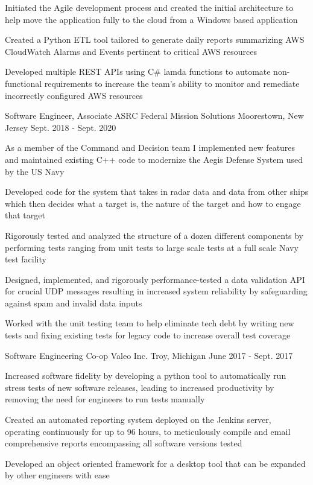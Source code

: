\begin{cventries}
{\begin{cvitems}
        \item {Initiated the Agile development process and created the initial architecture to help move the application fully to the cloud from a Windows based application}
        \item {Created a Python ETL tool tailored to generate daily reports summarizing AWS CloudWatch Alarms and Events pertinent to critical AWS resources}
        \item {Developed multiple REST APIs using C\# lamda functions to automate non-functional requirements to increase the team's ability to monitor and remediate incorrectly configured AWS resources}
      \end{cvitems} 
    }  
  \cventry
    {Software Engineer, Associate}
    {ASRC Federal Mission Solutions}
    {Moorestown, New Jersey}
    {Sept. 2018 - Sept. 2020}
    {
      \begin{cvitems}
        \item {As a member of the Command and Decision team I implemented new features and maintained existing C++ code to modernize the Aegis Defense System used by the US Navy}
        \item {Developed code for the system that takes in radar data and data from other ships which then decides what a target is, the nature of the target and how to engage that target}
        \item {Rigorously tested and analyzed the structure of a dozen different components by performing tests ranging from unit tests to large scale tests at a full scale Navy test facility}
        \item {Designed, implemented, and rigorously performance-tested a data validation API for crucial UDP messages resulting in increased system reliability by safeguarding against spam and invalid data inputs}
        \item {Worked with the unit testing team to help eliminate tech debt by writing new tests and fixing existing tests for legacy code to increase overall test coverage}
      \end{cvitems} 
    }  
  \cventry
    {Software Engineering Co-op}
    {Valeo Inc.}
    {Troy, Michigan}
    {June 2017 - Sept. 2017}
    {
      \begin{cvitems}
        \item {Increased software fidelity by developing a python tool to automatically run stress tests of new software releases, leading to increased productivity by removing the need for engineers to run tests manually}
        \item {Created an automated reporting system deployed on the Jenkins server, operating continuously for up to 96 hours, to meticulously compile and email comprehensive reports encompassing all software versions tested}
        \item {Developed an object oriented framework for a desktop tool that can be expanded by other engineers with ease}
      \end{cvitems}
    }
\end{cventries}
